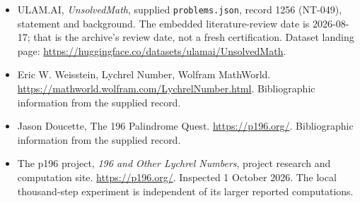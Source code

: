 \documentclass[11pt,a4paper]{article}
\begin{document}
{\small

\begin{itemize}

\item[\hypertarget{source:1256:1}{S1}] ULAM.AI, \emph{UnsolvedMath}, supplied \texttt{problems.json}, record 1256 (NT-049), statement and background. The embedded literature-review date is 2026-08-17; that is the archive’s review date, not a fresh certification. Dataset landing page: \url{https://huggingface.co/datasets/ulamai/UnsolvedMath}.

\item[\hypertarget{source:1256:2}{S2}] Eric W. Weisstein, Lychrel Number, Wolfram MathWorld. \url{https://mathworld.wolfram.com/LychrelNumber.html}. Bibliographic information from the supplied record.

\item[\hypertarget{source:1256:3}{S3}] Jason Doucette, The 196 Palindrome Quest. \url{https://p196.org/}. Bibliographic information from the supplied record.


\item[E1] The p196 project, \emph{196 and Other Lychrel Numbers},
project research and computation site. \url{https://p196.org/}.
Inspected 1 October 2026. The local thousand-step experiment is
independent of its larger reported computations.

\end{itemize}

}

\label{end:1256}
\end{document}
